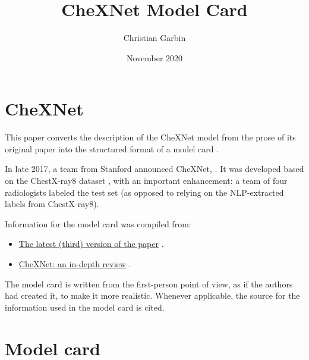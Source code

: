 \documentclass{article}
\title{CheXNet Model Card}
\author{Christian Garbin}
\date{November 2020}
\begin{document}
\maketitle

\section{CheXNet}

This paper converts the description of the CheXNet model from the prose of its original paper into the structured format of a model card \cite{Mitchell2018}.

In late 2017, a team from Stanford announced CheXNet,  \cite{Rajpurkar2017}. It was developed based on the ChestX-ray8 dataset \cite{Wang2017}, with an important enhancement: a team of four radiologists labeled the test set (as opposed to relying on the NLP-extracted labels from ChestX-ray8).

Information for the model card was compiled from:

\begin{itemize}
    \item \href{https://arxiv.org/abs/1711.05225}{The latest (third) version of the paper} \cite{Rajpurkar2017}.
    \item \href{https://lukeoakdenrayner.wordpress.com/2018/01/24/chexnet-an-in-depth-review/}{CheXNet: an in-depth review} \cite{OakdenRayner2018a}.
\end{itemize}

The model card is written from the first-person point of view, as if the authors had created it, to make it more realistic. Whenever applicable, the source for the information used in the model card is cited.

\pagebreak

\section{Model card}

\newenvironment{mcsection}[1]
    {%
        \textbf{#1}

        \begin{itemize}[leftmargin=*,topsep=0pt,itemsep=-1ex,partopsep=1ex,parsep=1ex,after=\vspace{\medskipamount}]
    }
    {%
        \end{itemize}
    }
\end{document}
